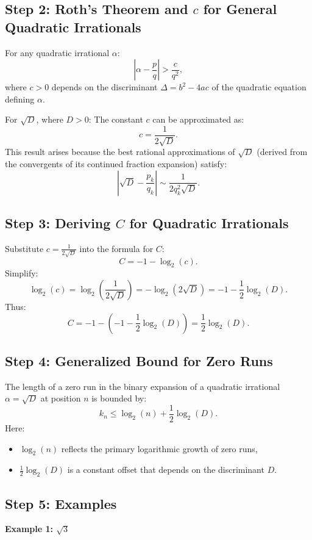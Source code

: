 \subsection*{Step 2: Roth's Theorem and \(c\) for General Quadratic Irrationals}

For any quadratic irrational \(\alpha\):
\[
\left|\alpha - \frac{p}{q}\right| > \frac{c}{q^2},
\]
where \(c > 0\) depends on the discriminant \(\Delta = b^2 - 4ac\) of the quadratic equation defining \(\alpha\).

For \(\sqrt{D}\), where \(D > 0\):
The constant \(c\) can be approximated as:
\[
c = \frac{1}{2\sqrt{D}}.
\]
This result arises because the best rational approximations of \(\sqrt{D}\) (derived from the convergents of its continued fraction expansion) satisfy:
\[
\left|\sqrt{D} - \frac{p_k}{q_k}\right| \sim \frac{1}{2q_k^2\sqrt{D}}.
\]

\subsection*{Step 3: Deriving \(C\) for Quadratic Irrationals}

Substitute \(c = \frac{1}{2\sqrt{D}}\) into the formula for \(C\):
\[
C = -1 - \log_2(c).
\]
Simplify:
\[
\log_2(c) = \log_2\left(\frac{1}{2\sqrt{D}}\right) = -\log_2(2\sqrt{D}) = -1 - \frac{1}{2}\log_2(D).
\]
Thus:
\[
C = -1 - \left(-1 - \frac{1}{2}\log_2(D)\right) = \frac{1}{2}\log_2(D).
\]

\subsection*{Step 4: Generalized Bound for Zero Runs}

The length of a zero run in the binary expansion of a quadratic irrational \(\alpha = \sqrt{D}\) at position \(n\) is bounded by:
\[
k_n \leq \log_2(n) + \frac{1}{2}\log_2(D).
\]
Here:
\begin{itemize}
    \item \(\log_2(n)\) reflects the primary logarithmic growth of zero runs,
    \item \(\frac{1}{2}\log_2(D)\) is a constant offset that depends on the discriminant \(D\).
\end{itemize}

\subsection*{Step 5: Examples}

\textbf{Example 1: \(\sqrt{3}\)}

